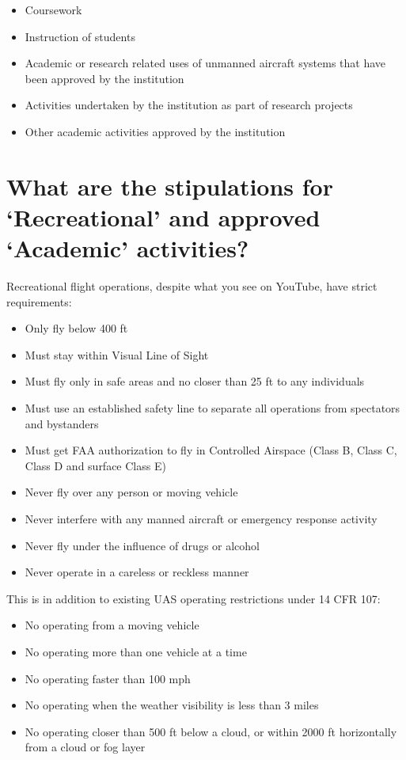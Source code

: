 \documentclass[
]{book}
\providecommand{\tightlist}{%
  \setlength{\itemsep}{0pt}\setlength{\parskip}{0pt}}
\begin{document}
\begin{itemize}
\tightlist
\item
  Coursework
\item
  Instruction of students
\item
  Academic or research related uses of unmanned aircraft systems that have been approved by the institution
\item
  Activities undertaken by the institution as part of research projects
\item
  Other academic activities approved by the institution
\end{itemize}

\hypertarget{what-are-the-stipulations-for-recreational-and-approved-academic-activities}{%
\section{What are the stipulations for `Recreational' and approved `Academic' activities?}\label{what-are-the-stipulations-for-recreational-and-approved-academic-activities}}

Recreational flight operations, despite what you see on YouTube, have strict requirements:

\begin{itemize}
\tightlist
\item
  Only fly below 400 ft
\item
  Must stay within Visual Line of Sight
\item
  Must fly only in safe areas and no closer than 25 ft to any individuals
\item
  Must use an established safety line to separate all operations from spectators and bystanders
\item
  Must get FAA authorization to fly in Controlled Airspace (Class B, Class C, Class D and surface Class E)
\item
  Never fly over any person or moving vehicle
\item
  Never interfere with any manned aircraft or emergency response activity
\item
  Never fly under the influence of drugs or alcohol
\item
  Never operate in a careless or reckless manner
\end{itemize}

This is in addition to existing UAS operating restrictions under 14 CFR 107:

\begin{itemize}
\tightlist
\item
  No operating from a moving vehicle
\item
  No operating more than one vehicle at a time
\item
  No operating faster than 100 mph
\item
  No operating when the weather visibility is less than 3 miles
\item
  No operating closer than 500 ft below a cloud, or within 2000 ft horizontally from a cloud or fog layer
\end{itemize}
\end{document}
